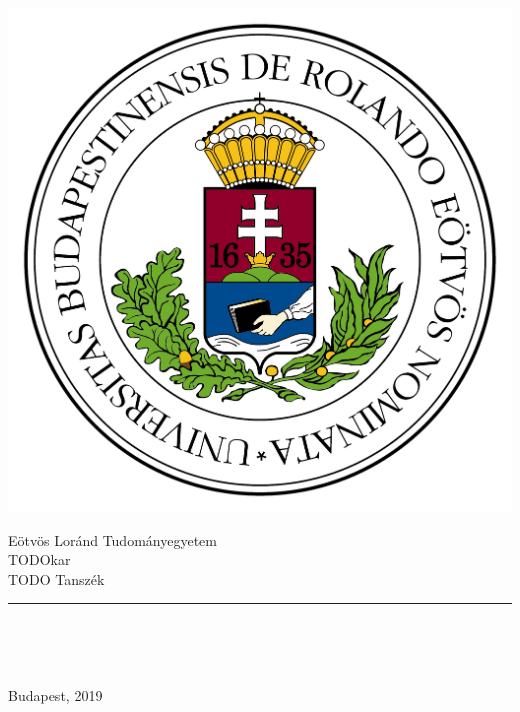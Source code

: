 \begin{titlepage}

\begin{minipage}{0.40\linewidth}
\includegraphics[scale=0.3]{images/elte_logo}
\end{minipage}
\begin{minipage}{0.50\linewidth}
\begin{center}
Eötvös Loránd Tudományegyetem \\
TODOkar \\
TODO Tanszék
\end{center}
\end{minipage}

\hrule
 \vfill

\begin{center}
\Huge
\textbf{\Title}
\normalsize
\end{center}

\begin{center}
	\Large
	\textbf{\SubTitle}
	\normalsize
\end{center}

\vfill

\begin{minipage}[t]{0.45\linewidth}
\begin{flushleft}
\textbf{\SupervisorName} \\
\SupervisorTitle
\end{flushleft}
\end{minipage}
\begin{minipage}[t]{0.5\linewidth}
\begin{flushright}
\textbf{\Author} \\
\AuthortTitle
\end{flushright}
\end{minipage}

\vfill

\begin{center}
Budapest, 2019
\end{center}

\end{titlepage}
